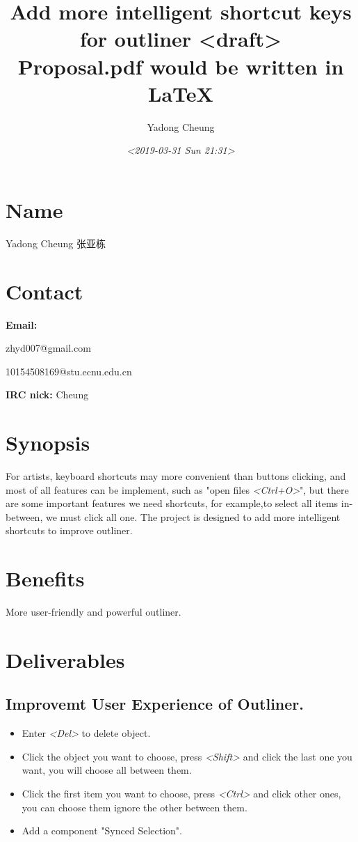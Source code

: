 \documentclass[11pt]{article}
\author{Yadong Cheung}
\date{\textit{<2019-03-31 Sun 21:31>}}
\title{Add more intelligent shortcut keys for outliner <draft>\\\medskip
\large Proposal.pdf would be written in \LaTeX}
\begin{document}
\maketitle


\section*{Name}
\label{sec:org9a11a28}
Yadong Cheung 张亚栋

\section*{Contact}
\label{sec:orge37a461}
\textbf{Email:}

zhyd007@gmail.com

10154508169@stu.ecnu.edu.cn

\textbf{IRC nick:} Cheung

\section*{Synopsis}
\label{sec:org8f5703a}
  For artists, keyboard shortcuts may more convenient than buttons clicking, and most of all features can be implement, such
 as "open files \emph{<Ctrl+O>}", but there are some important features we need shortcuts, for example,to select all items 
in-between, we  must click all one. 
The project is designed to add more intelligent shortcuts to improve outliner.

\section*{Benefits}
\label{sec:org7bc30ae}
More user-friendly and powerful outliner.

\section*{Deliverables}
\label{sec:orge87d1f9}
\subsection*{Improvemt User Experience of Outliner.}
\label{sec:org5d8b60c}
\begin{itemize}
\item Enter \emph{<Del>} to delete object.
\item Click the object you want to choose, press \emph{<Shift>} and click the last one you want, you will choose all between them.
\item Click the first item you want to choose, press \emph{<Ctrl>} and click other ones, you can choose them ignore the other between them.
\item Add a component "Synced Selection".
\end{itemize}
\end{document}

